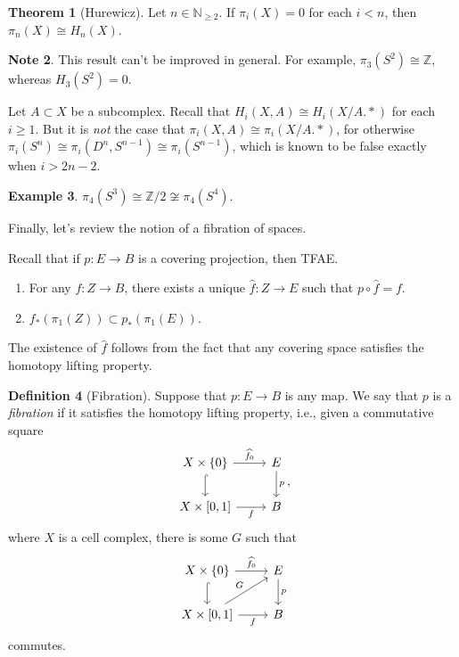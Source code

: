 \documentclass[10pt,letterpaper,cm]{nupset}
\theoremstyle{definition}
\newtheorem{defn}{Definition}[subsection]
\newtheorem{exmp}[defn]{Example}
\newtheorem{note}[defn]{Note}
\theoremstyle{theorem}
\newtheorem{theorem}[defn]{Theorem}
\theoremstyle{remark}
\newcommand{\N}{\mathbb N}
\newcommand{\Z}{\mathbb Z}
\newcommand{\1}{\mathbb{1}}
\newcommand{\0}{\vec 0}
\newcommand{\be}{\begin{enumerate}}
\newcommand{\ee}{\end{enumerate}}
\begin{document}
\begin{theorem}[Hurewicz] 
Let $n\in \N_{\geq 2}$. If $\pi_i(X) =0$ for each $i < n$, then $\pi_n(X) \cong H_n(X)$. 
\end{theorem}

\begin{note}
This result can't be improved in general. For example, $\pi_3(S^2) \cong \Z$, whereas $H_3(S^2) =0$.
\end{note}

Let $A \subset X$ be a subcomplex. Recall that $H_i(X, A) \cong H_i(X/A. \ast)$ for each $i\geq 1$. But it is \emph{not} the case that $\pi_i(X, A) \cong \pi_i(X/A. \ast)$, for otherwise  $\pi_i(S^n) \cong \pi_i(D^n, S^{n-1}) \cong \pi_i(S^{n-1})$, which is known to be false exactly when $i > 2n-2$. 

\begin{exmp}
$\pi_4(S^3) \cong \Z/2 \not \cong  \pi_4(S^4)$.
\end{exmp}

\bigskip

Finally, let's review the notion of a fibration of spaces.

\medskip

Recall that if $p: E \to B$ is a covering projection, then TFAE.
\be
\item For any $f: Z \to B$, there exists a unique $\hat{f} :Z \to E$ such that $p \circ \hat{f} = f$.
\item $f_{\ast}(\pi_1(Z)) \subset p_{\ast}(\pi_1(E))$.
\ee

The existence of $\hat{f}$ follows from the fact that any covering space satisfies the homotopy lifting property.

\begin{defn}[Fibration]
Suppose that $p: E \to B$ is any map. We say that $p$ is a \textit{fibration} if it satisfies the homotopy lifting property, i.e., given a commutative square
\[
\begin{tikzcd}
X\times \{0\} \arrow[d, hook] \arrow[r, "\widehat{f_0}"] & E \arrow[d, "p"] \\
{X\times [0,1]} \arrow[r, "f"']                      & B               
\end{tikzcd}
,\]  where $X$ is a cell complex, there is some $G$ such that
\[
\begin{tikzcd}
X\times \{0\} \arrow[d, hook] \arrow[r, "\widehat{f_0}"] & E \arrow[d, "p"] \\
{X\times [0,1]} \arrow[r, "f"'] \arrow[ru, "G"]      & B               
\end{tikzcd}
\] commutes. 
\end{defn}
\end{document}
